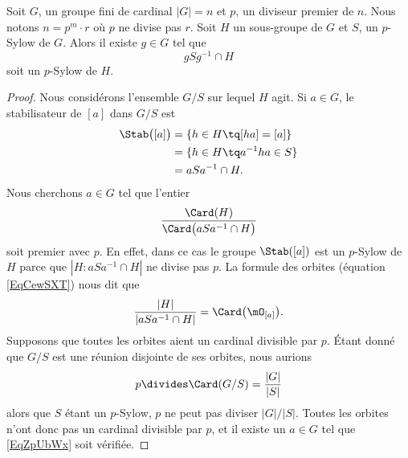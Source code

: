 \begin{lemma}       \label{LemwDYQMg}
    Soit \( G\), un groupe fini de cardinal \( | G |=n\) et \( p\), un diviseur premier de \( n\). Nous notons \( n=p^m\cdot r\) où \( p\) ne divise pas \( r\). Soit \( H\) un sous-groupe de \( G\) et \( S\), un \( p\)-Sylow de \( G\). Alors il existe \( g\in G\) tel que 
    \begin{equation}
        gSg^{-1}\cap H
    \end{equation}
    soit un \( p\)-Sylow de \( H\).
\end{lemma}

\begin{proof}
    Nous considérons l'ensemble \( G/S\) sur lequel \( H\) agit. Si \( a\in G\), le stabilisateur de \( [a]\) dans \( G/S\) est
    \begin{subequations}
        \begin{align}
            \Stab\big( [a] \big)&=\{ h\in H\tq [ha]=[a] \}\\
            &=\{ h\in H\tq a^{-1}ha\in S\}\\
            &=aSa^{-1}\cap H.
        \end{align}
    \end{subequations}
    Nous cherchons \( a\in G\) tel que l'entier
    \begin{equation}        \label{EqZpUbWx}
        \frac{ \Card(H) }{ \Card\big( aSa^{-1}\cap H \big) }
    \end{equation}
    soit premier avec \( p\). En effet, dans ce cas le groupe \( \Stab([a])\) est un $p$-Sylow de \( H\) parce que \( | H:aSa^{-1}\cap H |\) ne divise pas \( p\). La formule des orbites (équation \eqref{EqCewSXT}) nous dit que
    \begin{equation}
        \frac{ | H | }{ | aSa^{-1}\cap H | }=\Card\big( \mO_{[a]} \big).
    \end{equation}
    Supposons que toutes les orbites aient un cardinal divisible par \( p\). Étant donné que \( G/S\) est une réunion disjointe de ses orbites, nous aurions
    \begin{equation}
        p\divides \Card(G/S)=\frac{ | G | }{ | S | }
    \end{equation}
    alors que \( S\) étant un $p$-Sylow, \( p\) ne peut pas diviser \( | G |/| S |\). Toutes les orbites n'ont donc pas un cardinal divisible par \( p\), et il existe un \( a\in G\) tel que \eqref{EqZpUbWx} soit vérifiée.
\end{proof}


